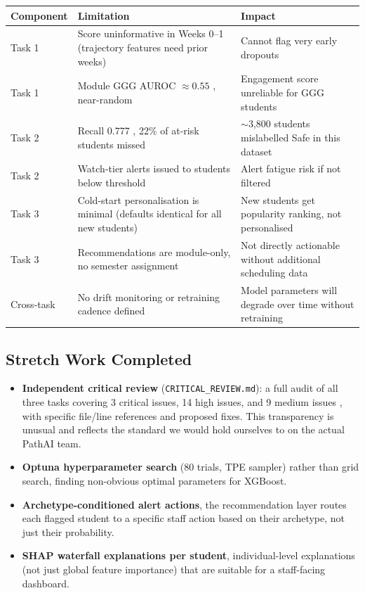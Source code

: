 \documentclass[10pt,a4paper]{article}
\begin{document}
\begin{center}
\small
\begin{tabularx}{\linewidth}{@{}lLL@{}}
\toprule
\textbf{Component} & \textbf{Limitation} & \textbf{Impact} \\
\midrule
Task 1 & Score uninformative in Weeks 0–1 (trajectory features need prior weeks) & Cannot flag very early dropouts \\
Task 1 & Module GGG AUROC $\approx 0.55$ , near-random & Engagement score unreliable for GGG students \\
Task 2 & Recall 0.777 , 22\% of at-risk students missed & $\sim$3,800 students mislabelled Safe in this dataset \\
Task 2 & Watch-tier alerts issued to students below threshold & Alert fatigue risk if not filtered \\
Task 3 & Cold-start personalisation is minimal (defaults identical for all new students) & New students get popularity ranking, not personalised \\
Task 3 & Recommendations are module-only, no semester assignment & Not directly actionable without additional scheduling data \\
Cross-task & No drift monitoring or retraining cadence defined & Model parameters will degrade over time without retraining \\
\bottomrule
\end{tabularx}
\end{center}

\subsection{Stretch Work Completed}

\begin{itemize}
  \item \textbf{Independent critical review} (\texttt{CRITICAL\_REVIEW.md}): a full audit of
    all three tasks covering 3 critical issues, 14 high issues, and 9 medium issues , with
    specific file/line references and proposed fixes. This transparency is unusual and reflects
    the standard we would hold ourselves to on the actual PathAI team.
  \item \textbf{Optuna hyperparameter search} (80 trials, TPE sampler) rather than grid search,
    finding non-obvious optimal parameters for XGBoost.
  \item \textbf{Archetype-conditioned alert actions}, the recommendation layer routes each
    flagged student to a specific staff action based on their archetype, not just their probability.
  \item \textbf{SHAP waterfall explanations per student}, individual-level explanations (not
    just global feature importance) that are suitable for a staff-facing dashboard.
\end{itemize}
\end{document}
